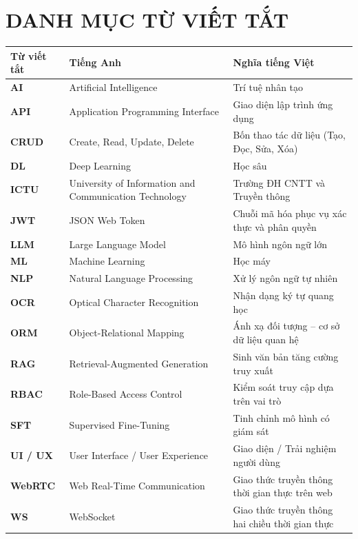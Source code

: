 
\chapter*{DANH MỤC TỪ VIẾT TẮT}

\begin{table}[htbp]
\centering
\begin{tabularx}{\textwidth}{l p{7.5cm} >{\raggedright\arraybackslash}X}
    \toprule
    \textbf{Từ viết tắt} & \textbf{Tiếng Anh} & \textbf{Nghĩa tiếng Việt} \\
    \midrule
    \textbf{AI}      & Artificial Intelligence           & Trí tuệ nhân tạo \\
    \textbf{API}     & Application Programming Interface & Giao diện lập trình ứng dụng \\
    \textbf{CRUD}    & Create, Read, Update, Delete      & Bốn thao tác dữ liệu (Tạo, Đọc, Sửa, Xóa) \\
    \textbf{DL}      & Deep Learning                     & Học sâu \\
    \textbf{ICTU}    & University of Information and Communication Technology & Trường ĐH CNTT và Truyền thông \\
    \textbf{JWT}     & JSON Web Token                    & Chuỗi mã hóa phục vụ xác thực và phân quyền \\
    \textbf{LLM}     & Large Language Model              & Mô hình ngôn ngữ lớn \\
    \textbf{ML}      & Machine Learning                  & Học máy \\
    \textbf{NLP}     & Natural Language Processing       & Xử lý ngôn ngữ tự nhiên \\
    \textbf{OCR}     & Optical Character Recognition     & Nhận dạng ký tự quang học \\
    \textbf{ORM}     & Object-Relational Mapping         & Ánh xạ đối tượng -- cơ sở dữ liệu quan hệ \\
    \textbf{RAG}     & Retrieval-Augmented Generation    & Sinh văn bản tăng cường truy xuất \\
    \textbf{RBAC}    & Role-Based Access Control         & Kiểm soát truy cập dựa trên vai trò \\
    \textbf{SFT}     & Supervised Fine-Tuning            & Tinh chỉnh mô hình có giám sát \\
    \textbf{UI / UX} & User Interface / User Experience  & Giao diện / Trải nghiệm người dùng \\
    \textbf{WebRTC}  & Web Real-Time Communication       & Giao thức truyền thông thời gian thực trên web \\
    \textbf{WS}      & WebSocket                         & Giao thức truyền thông hai chiều thời gian thực \\
    \bottomrule
\end{tabularx}
\end{table}

\clearpage
